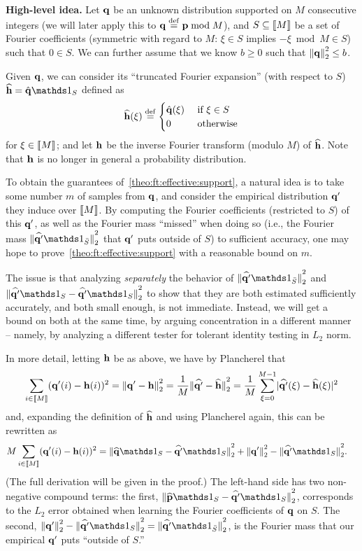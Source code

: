 \medskip

\noindent \textbf{High-level idea.} 
Let $\mathbf{q}$ be an unknown distribution supported on $M$ consecutive integers (we will later apply this to $\mathbf{q}\stackrel{\rm def}{=} \mathbf{p} \bmod M$), and $S\subseteq\llbracket M\rrbracket$ be a set of Fourier coefficients (symmetric with regard to $M$: $\xi\in S$ implies $-\xi \bmod M \in S$) such that $0\in S$. We can further assume that we know $b\geq 0$ such that ${\lVert\mathbf{q}{\rVert}}_2^2 \leq b$.

Given $\mathbf{q}$, we can consider its ``truncated Fourier expansion'' (with respect to $S$) $\fourier{\h}=\hat{\q}\indicSet{S}$ defined as
\[
    \widehat{\mathbf{h}}(\xi) \stackrel{\rm def}{=}
      \begin{cases}
          \hat{\mathbf{q}}(\xi) & \text{ if } \xi\in S\\
          0 & \text{ otherwise}
      \end{cases}
\]
for $\xi\in\llbracket M\rrbracket$; and let $\mathbf{h}$ be the inverse Fourier transform (modulo $M$) of $\widehat{\mathbf{h}}$. Note that $\mathbf{h}$ is no longer in general a probability distribution.\medskip

To obtain the guarantees of~\cref{theo:ft:effective:support}, a natural idea is to take some number $m$ of samples from $\mathbf{q}$, and consider the empirical distribution $\mathbf{q}'$ they induce over $\llbracket M\rrbracket$. By computing the Fourier coefficients (restricted to $S$) of this $\mathbf{q}'$, as well as the Fourier mass ``missed'' when doing so (i.e., the Fourier mass $\normtwo{\fourier{\q'}\indicSet{\bar{S}}}^2$ that $\mathbf{q}'$ puts outside of $S$) to sufficient accuracy, one may hope to prove~\cref{theo:ft:effective:support} with a reasonable bound on $m$.

The issue is that analyzing \emph{separately} the behavior of $\normtwo{\fourier{\q'}\indicSet{\bar{S}}}^2$ and $\normtwo{\fourier{\q'}\indicSet{S}-\fourier{\q'}\indicSet{S}}^2$ to show that they are both estimated sufficiently accurately, and both small enough, is not immediate. Instead, we will get a bound on both at the same time, by arguing concentration in a different manner -- namely, by analyzing a different tester for tolerant identity testing in $L_2$ norm.

In more detail, letting $\mathbf{h}$ be as above, we have by Plancherel that
\[
  \sum_{i\in \llbracket M\rrbracket} (\mathbf{q}'(i)-\mathbf{h}(i))^2 = {\lVert\mathbf{q}'-\mathbf{h}{\rVert}}_2^2 = \frac{1}{M}{\lVert\widehat{\mathbf{q}'}-\widehat{\mathbf{h}}{\rVert}}_2^2 = \frac{1}{M}\sum_{\xi=0}^{M-1} \lvert \widehat{\mathbf{q}'}(\xi)-\widehat{\mathbf{h}}(\xi) \rvert^2
\]
and, expanding the definition of $\widehat{\mathbf{h}}$ and using Plancherel again, this can be rewritten as
\begin{align*}
  M\sum_{i\in \modulo{M}} (\q'(i)-\h(i))^2 &=  \normtwo{\fourier{\q}\indicSet{S}-\fourier{\q'}\indicSet{S}}^2 + \normtwo{\q'}^2 - \normtwo{\fourier{\q'}\indicSet{S}}^2.
\end{align*}
(The full derivation will be given in the proof.) The left-hand side has two non-negative compound terms: the first, $\normtwo{\fourier{\p}\indicSet{S}-\fourier{\q'}\indicSet{S}}^2$, corresponds to the $L_2$ error obtained when learning the Fourier coefficients of $\mathbf{q}$ on $S$. The second, $\normtwo{\q'}^2 - \normtwo{\fourier{\q'}\indicSet{S}}^2 = \normtwo{\fourier{\q'}\indicSet{\bar{S}}}^2$, is the Fourier mass that our empirical $\mathbf{q}'$ puts ``outside of $S$.''

